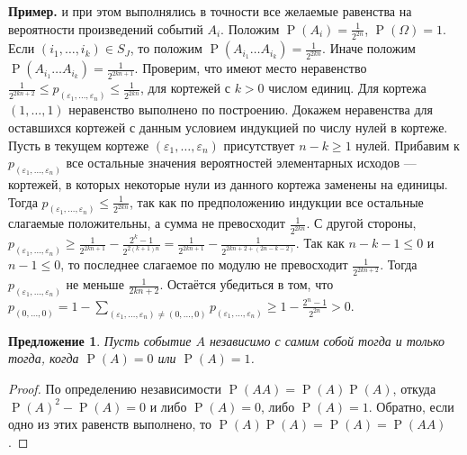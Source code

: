\documentclass[12pt]{article}
\newtheorem{proposition}[theorem]{Предложение}
\numberwithin{theorem}{section}
\theoremstyle{definition}
\newenvironment{example}{\indent \textbf{Пример.}}{\indent}
\newcommand{\prob}{\operatorname{P}}
\begin{document}
\begin{example}
		и при этом выполнялись в точности все желаемые равенства на вероятности произведений событий $ A_i $.
		Положим $ \prob(A_i) = \tfrac{1}{2^{2n}} $, $ \prob(\Omega) = 1 $.
		Если $ (i_1, \ldots, i_k) \in S_{J} $, то положим $ \prob(A_{i_1}\ldots A_{i_k}) = \tfrac{1}{2^{2kn}} $.
		Иначе положим $ \prob(A_{i_1}\ldots A_{i_k}) = \tfrac{1}{2^{2kn + 1}} $.
		Проверим, что имеют место неравенство
		$ \tfrac{1}{2^{2kn + 2}} \leqslant p_{(\varepsilon_1, \ldots, \varepsilon_n)} \leqslant \tfrac{1}{2^{2kn}} $,
		для кортежей с $ k > 0 $ числом единиц.
		Для кортежа $ (1, \ldots, 1) $ неравенство выполнено по построению.
		Докажем неравенства для оставшихся кортежей с данным условием индукцией по числу нулей в кортеже.
		Пусть в текущем кортеже $ (\varepsilon_1, \ldots, \varepsilon_n) $ присутствует $ n - k \geqslant 1 $ нулей.
		Прибавим к $ p_{(\varepsilon_1, \ldots, \varepsilon_n)} $ все остальные значения вероятностей элементарных исходов
		--- кортежей, в которых некоторые нули из данного кортежа заменены на единицы.
		Тогда $ p_{(\varepsilon_1, \ldots, \varepsilon_n)} \leqslant \tfrac{1}{2^{2kn}} $,
		так как по предположению индукции все остальные слагаемые положительны, а сумма не превосходит $ \tfrac{1}{2^{2kn}} $.
		С другой стороны, 
		$ p_{(\varepsilon_1, \ldots, \varepsilon_n)} \geqslant \tfrac{1}{2^{2kn + 1}} - \tfrac{2^k - 1}{2^{2(k + 1)n}}
		= \tfrac{1}{2^{2kn + 1}} - \tfrac{1}{2^{2kn + 2 + (2n - k - 2)}} $.
		Так как $ n - k - 1 \leqslant 0 $ и $ n - 1 \leqslant 0 $, 
		то последнее слагаемое по модулю не превосходит $ \tfrac{1}{2^{2kn + 2}} $.
		Тогда $ p_{(\varepsilon_1, \ldots, \varepsilon_n)} $ не меньше $ \tfrac{1}{2kn + 2} $.
		Остаётся убедиться в том, что $ p_{(0, \ldots, 0)} 
		= 1 - \sum\limits_{(\varepsilon_1, \ldots, \varepsilon_n) \neq (0, \ldots, 0)} p_{(\varepsilon_1, \ldots, \varepsilon_n)}
		\geqslant 1 - \tfrac{2^n - 1}{2^{2n}} > 0 $.
	\end{example}
	
	\begin{proposition} \label{self independent}
		Пусть событие $ A $ независимо с самим собой тогда и только тогда, когда $ \prob(A) = 0 $ или $ \prob(A) = 1 $.
	\end{proposition}
	
	\begin{proof}
		По определению независимости $ \prob(AA) = \prob(A)\prob(A) $, откуда $ \prob(A)^2 - \prob(A) = 0 $
		и либо $ \prob(A) = 0 $, либо $ \prob(A) = 1 $. Обратно, если одно из этих равенств выполнено,
		то $ \prob(A)\prob(A) = \prob(A) = \prob(AA) $.
	\end{proof}
	
\end{document}

